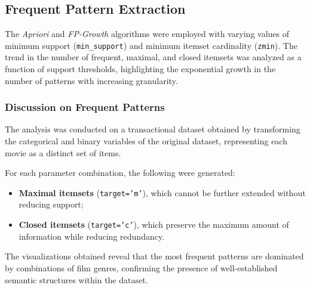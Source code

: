 \documentclass[10pt]{article}
\begin{document}
\subsection{Frequent Pattern Extraction}
The \textit{Apriori} and \textit{FP-Growth} algorithms were employed with varying values of minimum support (\texttt{min\_support}) and minimum itemset cardinality (\texttt{zmin}). The trend in the number of frequent, maximal, and closed itemsets was analyzed as a function of support thresholds, highlighting the exponential growth in the number of patterns with increasing granularity.
\subsubsection{Discussion on Frequent Patterns}

The analysis was conducted on a transactional dataset obtained by transforming the categorical and binary variables of the original dataset, representing each movie as a distinct set of items.

For each parameter combination, the following were generated:
\begin{itemize}
    \item \textbf{Maximal itemsets} (\texttt{target='m'}), which cannot be further extended without reducing support;
    \item \textbf{Closed itemsets} (\texttt{target='c'}), which preserve the maximum amount of information while reducing redundancy.
\end{itemize}

The visualizations obtained reveal that the most frequent patterns are dominated by combinations of film genres, confirming the presence of well-established semantic structures within the dataset.
\end{document}
